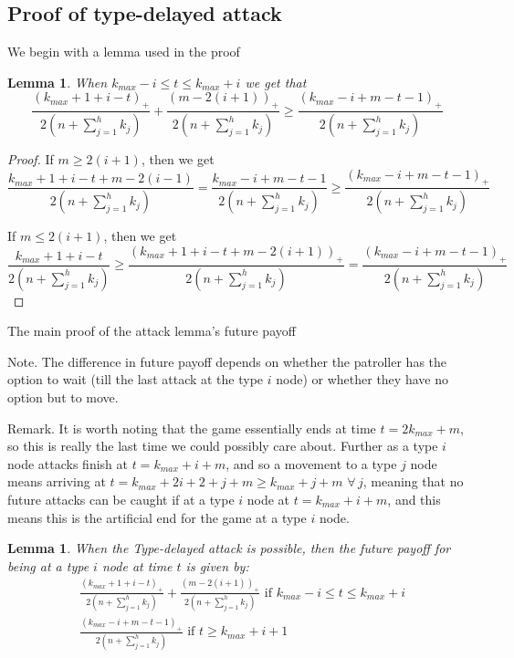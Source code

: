 \documentclass[a4paper,10pt]{article}
\newcommand{\denominator}{\ensuremath{n+\sum\limits_{j=1}^{h} k_{j}}}
\newcommand{\pospart}[1]{\left( #1 \right)_{+}}
\newtheorem{lemma}[theorem]{Lemma}
\theoremstyle{definition}
\theoremstyle{definition}
\theoremstyle{remark}
\theoremstyle{definition}
\begin{document}
\subsection{Proof of type-delayed attack}
\label{Appendix:Proof of type-delayed attack}
We begin with a lemma used in the proof
\begin{lemma}
When $k_{max}-i \leq t \leq k_{max}+i$ we get that
$$\frac{\pospart{k_{max}+1+i-t}}{2 \left( \denominator \right)} + \frac{\pospart{m-2(i+1)}}{2 \left( \denominator \right)} \geq \frac{\pospart{k_{max}-i+m-t-1}}{2 \left( \denominator \right)} $$
\end{lemma}

\begin{proof}
If $m \geq 2(i+1)$, then we get
$$\frac{k_{max}+1+i-t+m-2(i-1)}{2 \left( \denominator \right)}=\frac{k_{max}-i+m-t-1}{2 \left( \denominator \right)} \geq \frac{\pospart{k_{max}-i+m-t-1}}{2 \left( \denominator \right)}$$

If $m \leq 2(i+1)$, then we get
$$\frac{k_{max}+1+i-t}{2 \left( \denominator \right)} \geq \frac{\pospart{k_{max}+1+i-t+m-2(i+1)}}{2 \left( \denominator \right)} =\frac{\pospart{k_{max}-i+m-t-1}}{2 \left( \denominator \right)}$$
\end{proof}

The main proof of the attack lemma's future payoff

Note. The difference in future payoff depends on whether the patroller has the option to wait (till the last attack at the type $i$ node) or whether they have no option but to move.

Remark. It is worth noting that the game essentially ends at time $t=2k_{max}+m$, so this is really the last time we could possibly care about. Further as a type $i$ node attacks finish at $t=k_{max}+i+m$, and so a movement to a type $j$ node means arriving at $t=k_{max}+2i+2+j+m \geq k_{max}+j+m$ $\forall \, j$, meaning that no future attacks can be caught if at a type $i$ node at $t=k_{max}+i+m$, and this means this is the artificial end for the game at a type $i$ node.

\begin{lemma}
When the Type-delayed attack is possible, then the future payoff for being at a type $i$ node at time $t$ is given by:
\begin{align*}
&\frac{\pospart{k_{max}+1+i-t}}{2 \left( \denominator \right)} + \frac{\pospart{m-2(i+1)}}{2 \left( \denominator \right)} \text{  if } k_{max}-i \leq t \leq k_{max}+i \\
&\frac{\pospart{k_{max}-i+m-t-1}}{2 \left( \denominator \right)} \text{  if } t \geq k_{max}+i+1
\end{align*}
\end{lemma}
\end{document}
